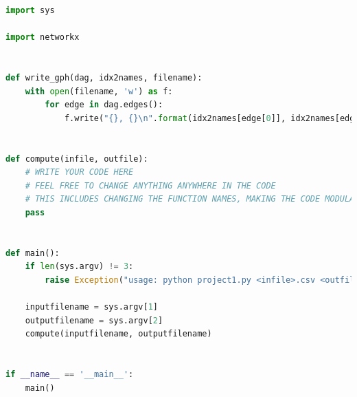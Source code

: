 \documentclass[twoside,11pt]{article}
\begin{document}
\begin{algorithm}
\begin{lstlisting}[language=Python]
import sys

import networkx


def write_gph(dag, idx2names, filename):
    with open(filename, 'w') as f:
        for edge in dag.edges():
            f.write("{}, {}\n".format(idx2names[edge[0]], idx2names[edge[1]]))


def compute(infile, outfile):
    # WRITE YOUR CODE HERE
    # FEEL FREE TO CHANGE ANYTHING ANYWHERE IN THE CODE
    # THIS INCLUDES CHANGING THE FUNCTION NAMES, MAKING THE CODE MODULAR, BASICALLY ANYTHING
    pass


def main():
    if len(sys.argv) != 3:
        raise Exception("usage: python project1.py <infile>.csv <outfile>.gph")

    inputfilename = sys.argv[1]
    outputfilename = sys.argv[2]
    compute(inputfilename, outputfilename)


if __name__ == '__main__':
    main()

\end{lstlisting}
\end{algorithm}
\end{document}
